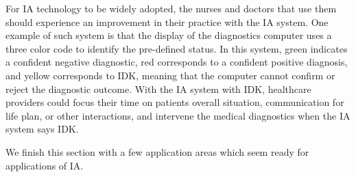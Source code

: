 \documentclass[11pt]{pnas-new}
\begin{document}

  For IA technology to be widely adopted, the nurses and doctors that
  use them should experience an improvement in their practice {\color{blue}with the IA system. One example of such system is}
  that the display of the diagnostics computer uses a three color code
  to identify {\color{blue}the pre-defined status. In this system,} green indicates a confident
  negative diagnostic, red corresponds to a confident positive
  diagnosis, and yellow corresponds to IDK, meaning that the
  computer cannot confirm or reject the diagnostic outcome. {\color{blue}%
  With the IA system with IDK, healthcare providers could focus their time on patients overall situation, communication for life plan, or other interactions, and intervene the medical diagnostics when the IA system says IDK.}



  
  We finish this section with a few application areas which seem ready
  for applications of IA.
  
\end{document}
